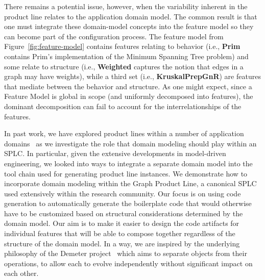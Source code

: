 There remains a potential issue, however, when the variability inherent
in the product line relates to the application domain model. The common
result is that one must integrate these domain-model concepts into the
feature model so they can become part of the configuration process. The
feature model from Figure~\ref{fig:feature-model} contains features
relating to behavior (i.e., \textbf{Prim} contains Prim's implementation
of the Minimum Spanning Tree problem) and some relate to structure
(i.e., \textbf{Weighted} captures the notion that edges in a graph may
have weights), while a third set (i.e., \textbf{KruskalPrepGnR}) are
features that mediate between the behavior and structure. As one might
expect, since a Feature Model is global in scope (and uniformly
decomposed into features), the dominant decomposition can fail to
account for the interrelationships of the features.

In past work, we have explored product lines within a number of
application domains~\cite{Heineman:2015:TMO:2791060.2791076,PEPM18} as
we investigate the role that domain modeling should play within an SPLC.
In particular, given the extensive developments in model-driven
engineering, we looked into ways to integrate a separate domain model
into the tool chain used for generating product line instances. We
demonstrate how to incorporate domain modeling within the Graph Product
Line, a canonical SPLC used extensively within the research community.
Our focus is on using code generation to automatically generate the
boilerplate code that would otherwise have to be customized based on
structural considerations determined by the domain model. Our aim is to
make it easier to design the code artifacts for individual features that
will be able to compose together regardless of the structure of the
domain model. In a way, we are inspired by the underlying philosophy of
the Demeter project~\cite{karl:demeter} which aims to separate objects
from their operations, to allow each to evolve independently without
significant impact on each other.



